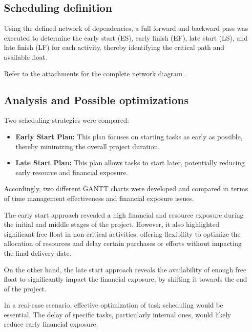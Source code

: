 \subsection{Scheduling definition}
Using the defined network of dependencies, a full forward and backward pass was executed to determine the early start (ES), early finish (EF), late start (LS), and late finish (LF) for each activity, thereby identifying the critical path and available float.

Refer to the attachments for the complete network diagram \cite{NetworkDiagram}.

\subsection{Analysis and Possible optimizations}
Two scheduling strategies were compared:
\begin{itemize}
    \item \textbf{Early Start Plan:} This plan focuses on starting tasks as early as possible, thereby minimizing the overall project duration.
    \item \textbf{Late Start Plan:} This plan allows tasks to start later, potentially reducing early resource and financial exposure.
\end{itemize}

Accordingly, two different GANTT charts were developed and compared in terms of time management effectiveness and financial exposure issues.

The early start approach \cite{GanttChart1} revealed a high financial and resource exposure during the initial and middle stages of the project. However, it also highlighted significant free float in non-critical activities, offering flexibility to optimize the allocation of resources and delay certain purchases or efforts without impacting the final delivery date.

On the other hand, the late start approach \cite{GanttChart2} reveals the availability of enough free float to significantly impact the financial exposure, by shifting it towards the end of the project.

In a real-case scenario, effective optimization of task scheduling would be essential. The delay of specific tasks, particularly internal ones, would likely reduce early financial exposure.


